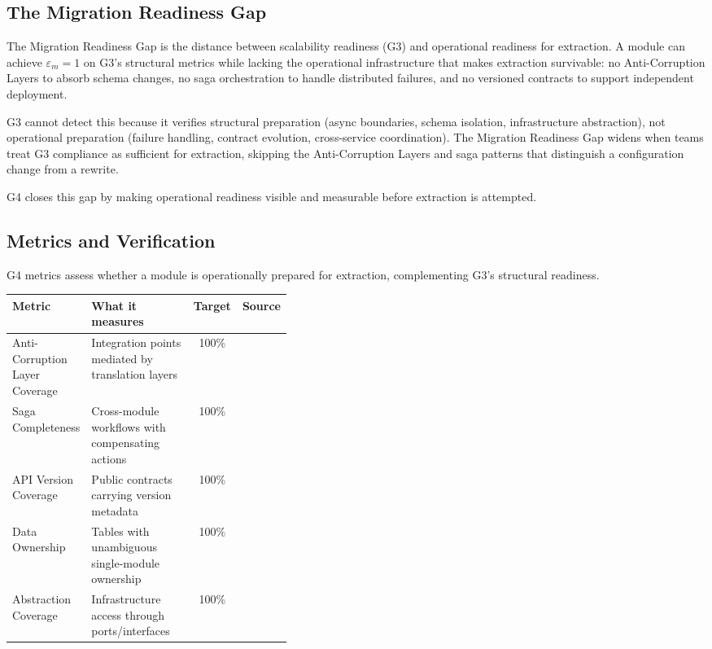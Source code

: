 \subsection*{The Migration Readiness Gap}
\label{sec:g4-readiness-gap}

The Migration Readiness Gap is the distance between scalability readiness (G3) and operational readiness for extraction. A module can achieve $\varepsilon_m = 1$ on G3's structural metrics while lacking the operational infrastructure that makes extraction survivable: no Anti-Corruption Layers to absorb schema changes, no saga orchestration to handle distributed failures, and no versioned contracts to support independent deployment.

G3 cannot detect this because it verifies structural preparation (async boundaries, schema isolation, infrastructure abstraction), not operational preparation (failure handling, contract evolution, cross-service coordination). The Migration Readiness Gap widens when teams treat G3 compliance as sufficient for extraction, skipping the Anti-Corruption Layers and saga patterns that distinguish a configuration change from a rewrite.

G4 closes this gap by making operational readiness visible and measurable before extraction is attempted.

\subsection*{Metrics and Verification}

G4 metrics assess whether a module is operationally prepared for extraction, complementing G3's structural readiness.

\medskip
\noindent
\small
\begin{tabularx}{\linewidth}{p{0.28\linewidth} X c p{0.12\linewidth}}
\toprule
\textbf{Metric} & \textbf{What it measures} & \textbf{Target} & \textbf{Source} \\
\midrule
Anti-Corruption Layer Coverage & Integration points mediated by translation layers & 100\% & \cite{evans2003ddd} \\
Saga Completeness & Cross-module workflows with compensating actions & 100\% & \cite{richardson2018microservices} \\
API Version Coverage & Public contracts carrying version metadata & 100\% & \cite{parnas1972informationhiding} \\
Data Ownership & Tables with unambiguous single-module ownership & 100\% & \cite{evans2003ddd} \\
Abstraction Coverage & Infrastructure access through ports/interfaces & 100\% & \cite{FordParsons2017} \\
\bottomrule
\end{tabularx}
\normalsize

